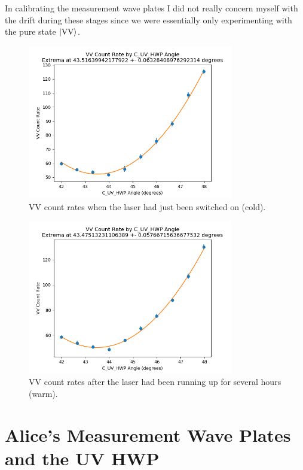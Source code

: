\documentclass{paper}[11pt]
\begin{document}
	In calibrating the measurement wave plates I did not really concern myself with the drift during these stages since we were essentially only experimenting with the pure state $\ket{\text{VV}}$.
	
	\begin{figure}[p]
		\centering
		\includegraphics[width=0.8\textwidth]{figures/min_VV_cold.png}
		\caption{VV count rates when the laser had just been switched on (cold).}
		\label{fig:min VV cold}
	\end{figure}
	\begin{figure}[p]
		\centering
		\includegraphics[width=0.8\textwidth]{figures/min_VV_warm.png}
		\caption{VV count rates after the laser had been running up for several hours (warm).}
		\label{fig:min VV warm}
	\end{figure}
	
	\section{Alice's Measurement Wave Plates and the UV HWP}
	
\end{document}
